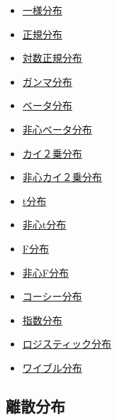 \documentclass[]{book}
\providecommand{\tightlist}{%
  \setlength{\itemsep}{0pt}\setlength{\parskip}{0pt}}
\begin{document}
\begin{itemize}
\tightlist
\item
  \protect\hyperlink{ux4e00ux69d8ux5206ux5e03}{一様分布}
\item
  \protect\hyperlink{ux6b63ux898fux5206ux5e03}{正規分布}
\item
  \protect\hyperlink{ux5bfeux6570ux6b63ux898fux5206ux5e03}{対数正規分布}
\item
  \protect\hyperlink{ux30acux30f3ux30deux5206ux5e03}{ガンマ分布}
\item
  \protect\hyperlink{ux30d9ux30fcux30bfux5206ux5e03}{ベータ分布}
\item
  \protect\hyperlink{ux975eux5fc3ux30d9ux30fcux30bfux5206ux5e03}{非心ベータ分布}
\item
  \protect\hyperlink{ux30abux30a4uxff12ux4e57ux5206ux5e03}{カイ２乗分布}
\item
  \protect\hyperlink{ux975eux5fc3ux30abux30a4uxff12ux4e57ux5206ux5e03}{非心カイ２乗分布}
\item
  \protect\hyperlink{tux5206ux5e03}{t分布}
\item
  \protect\hyperlink{ux975eux5fc3tux5206ux5e03}{非心t分布}
\item
  \protect\hyperlink{Fux5206ux5e03}{F分布}
\item
  \protect\hyperlink{ux975eux5fc3Fux5206ux5e03}{非心F分布}
\item
  \protect\hyperlink{ux30b3ux30fcux30b7ux30fcux5206ux5e03}{コーシー分布}
\item
  \protect\hyperlink{ux6307ux6570ux5206ux5e03}{指数分布}
\item
  \protect\hyperlink{ux30edux30b8ux30b9ux30c6ux30a3ux30c3ux30afux5206ux5e03}{ロジスティック分布}
\item
  \protect\hyperlink{ux30efux30a4ux30d6ux30ebux5206ux5e03}{ワイブル分布}
\end{itemize}

\subsection{離散分布}
\end{document}
